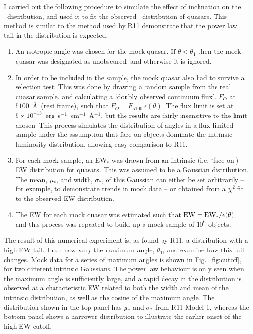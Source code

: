 I carried out the following procedure to simulate
the effect of inclination on the \ewo\ distribution, and used it to fit the
observed \ewo\ distribution of quasars.
This method is similar to the method used by R11 demonstrate that the power
law tail in the distribution is expected.
\begin{enumerate}
	\setlength\itemsep{1em}
	\item An isotropic angle was chosen for the mock quasar. 
	If $\theta<\theta_{1}$ then the mock quasar was designated as unobscured, 
	and otherwise it is ignored. 
	\item In order to be included in the sample, the mock quasar also had to 
	survive a selection test. This was done by drawing a random sample from the real quasar sample, 
	and calculating a `doubly observed continuum flux', $F_O$ at $5100$~\AA\ 
	(rest frame), such that $F_O = F_{5100}~\epsilon(\theta)$. The flux limit
	is set at $5\times10^{-13}$~erg~s$^{-1}$~cm$^{-1}$~\AA$^{-1}$, but the results
	are fairly insensitive to the limit chosen. This process simulates the 
	distribution of angles in a flux-limited sample under the assumption that face-on objects
	dominate the intrinsic luminosity distribution, allowing easy comparison to R11.
	\item For each mock sample, an EW$_*$ was drawn from an intrinsic 
	(i.e. `face-on') EW distribution for quasars. This was assumed to be a
	Gaussian distribution. The mean, $\mu_*$, and width, $\sigma_*$, of this Gaussian
	can either be set arbitrarily -- for example, to demonstrate trends
	in mock data -- or obtained from a $\chi^2$ fit to the observed EW
	distribution.
	\item The EW for each mock quasar 
	was estimated such that ${\rm EW} = {\rm EW}_* / \epsilon(\theta)$,
	and this process was repeated to build up a mock sample of $10^6$ objects.
\end{enumerate}
The result of this numerical experiment is, as found by R11, a distribution
with a high EW tail. I can now vary the maximum angle, $\theta_1$,
and examine how this tail changes. Mock data for a series
of maximum angles is shown in Fig.~\ref{fig:cutoff}, for two different intrinsic 
Gaussians. The power law behaviour is only seen when the maximum angle is
sufficiently large, and a rapid decay in the distribution is observed
at a characteristic EW related to both the width and mean of the
intrinsic distribution, as well as the cosine of the maximum angle.
The distribution shown in the top panel has $\mu_*$ and $\sigma_*$ from R11 Model 1, 
whereas the bottom panel shows a narrower distribution to illustrate the 
earlier onset of the high EW cutoff. 


